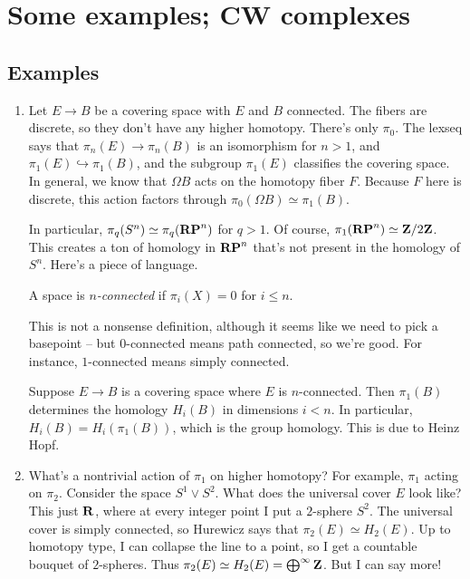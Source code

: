 \chapter{Some examples; CW complexes}
\section{Examples}
\begin{enumerate}
    \item Let $E\to B$ be a covering space with $E$ and $B$ connected. The fibers are discrete, so they don't have any higher homotopy. There's only $\pi_0$. The lexseq says that $\pi_n(E)\to \pi_n(B)$ is an isomorphism for $n>1$, and $\pi_1(E)\hookrightarrow \pi_1(B)$, and the subgroup $\pi_1(E)$ classifies the covering space. In general, we know that $\Omega B$ acts on the homotopy fiber $F$. Because $F$ here is discrete, this action factors through $\pi_0(\Omega B)\simeq \pi_1(B)$.

	In particular, $\pi_q(S^n)\simeq \pi_q(\mathbf{RP}^n)$ for $q>1$. Of course, $\pi_1(\mathbf{RP}^n)\simeq \mathbf Z/2\mathbf Z$. This creates a ton of homology in $\mathbf{RP}^n$ that's not present in the homology of $S^n$. Here's a piece of language.

	\begin{definition}
	    A space is \emph{$n$-connected} if $\pi_i(X) = 0$ for $i\leq n$.
	\end{definition}
	This is not a nonsense definition, although it seems like we need to pick a basepoint -- but $0$-connected means path connected, so we're good. For instance, $1$-connected means simply connected.

	Suppose $E\to B$ is a covering space where $E$ is $n$-connected. Then $\pi_1(B)$ determines the homology $H_i(B)$ in dimensions $i<n$. In particular, $H_i(B) = H_i(\pi_1(B))$, which is the group homology. This is due to Heinz Hopf.
    \item What's a nontrivial action of $\pi_1$ on higher homotopy? For example, $\pi_1$ acting on $\pi_2$. Consider the space $S^1\vee S^2$. What does the universal cover $E$ look like? This just $\mathbf R$, where at every integer point I put a $2$-sphere $S^2$. The universal cover is simply connected, so Hurewicz says that $\pi_2(E)\simeq H_2(E)$. Up to homotopy type, I can collapse the line to a point, so I get a countable bouquet of $2$-spheres. Thus $\pi_2(E)\simeq H_2(E) = \bigoplus^\infty\mathbf Z$. But I can say more!


\end{enumerate}
